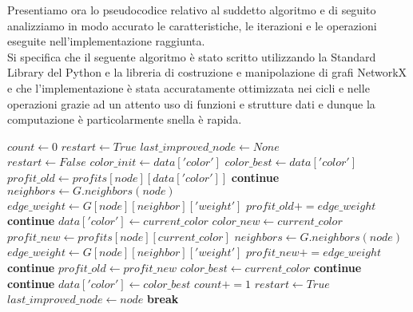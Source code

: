 Presentiamo ora lo pseudocodice relativo al suddetto algoritmo e di seguito analizziamo in modo accurato le caratteristiche, le iterazioni e le operazioni eseguite nell'implementazione raggiunta.\\

Si specifica che il seguente algoritmo è stato scritto utilizzando la Standard Library del Python e la libreria di costruzione e manipolazione di grafi NetworkX e che l'implementazione è stata accuratamente ottimizzata nei cicli e nelle operazioni grazie ad un attento uso di funzioni e strutture dati e dunque la computazione è particolarmente snella è rapida.\\

\begin{algorithmic}
\State $count\gets 0$
\State $restart\gets True$
\State $last\_improved\_node\gets None$\\

	\State $restart\gets False$
		\State $color\_init\gets data['color']$
		\State $color\_best\gets data['color']$
		\State $profit\_old\gets profits[node][data['color']]$
			\State \textbf{continue}
		\EndIf
		\State $neighbors\gets G.neighbors(node)$
				\State $edge\_weight\gets G[node][neighbor]['weight']$
				\State $profit\_old += edge\_weight$
			\Else
				\State \textbf{continue}
			\EndIf
		\EndFor
				\State $data['color']\gets current\_color$
				\State $color\_new\gets current\_color$
				\State $profit\_new\gets profits[node][current\_color]$
				\State $neighbors\gets G.neighbors(node)$
						\State $edge\_weight\gets G[node][neighbor]['weight']$
						\State $profit\_new += edge\_weight$
					\Else
						\State \textbf{continue}
					\EndIf
						\State $profit\_old\gets profit\_new$
						\State $color\_best\gets current\_color$
					\Else
						\State \textbf{continue}
					\EndIf
				\EndFor
			\Else
				\State \textbf{continue}
			\EndIf
		\EndFor
		\State $data['color']\gets color\_best$
			\State $count += 1$
			\State $restart\gets True$
			\State $last\_improved\_node\gets node$
			\State \textbf{break}
		\EndIf
	\EndFor
\EndWhile \\


\end{algorithmic}
